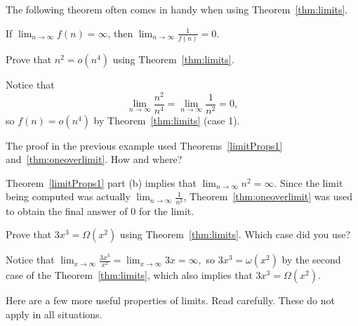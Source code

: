 The following theorem often comes in handy when using Theorem~\ref{thm:limits}.
\begin{thm}\label{thm:oneoverlimit}
If $\displaystyle \lim_{n\rightarrow \infty} f(n)=\infty$, then  
$\displaystyle \lim_{n\rightarrow \infty} \frac{1}{f(n)}=0$.
\end{thm}


\begin{exa}
Prove that  $n^2=o(n^4)$ using Theorem~\ref{thm:limits}.
\begin{sol}
Notice that 
$$\lim_{n\rightarrow\infty}\frac{n^2}{n^4}=
\lim_{n\rightarrow\infty}\frac{1}{n^2}=0,$$
so $f(n)=o(n^4)$ by Theorem~\ref{thm:limits} (case 1).
\end{sol}
\end{exa}

\begin{ques}
The proof in the previous example used Theorems~\ref{limitProps1}
and~\ref{thm:oneoverlimit}. How and where?

\noindent
\answerlinetwo
\begin{answer}
Theorem~\ref{limitProps1} part (b) implies that  
$\displaystyle\lim_{n\rightarrow\infty} n^2=\infty$. 
Since the limit being computed was actually 
$\displaystyle \lim_{n\rightarrow\infty}\frac{1}{n^2}$,
Theorem~\ref{thm:oneoverlimit}
was used to obtain the final answer of $0$ for the limit.
\end{answer}
\end{ques}

\begin{exer}
Prove that $3x^3=\Omega(x^2)$ using Theorem~\ref{thm:limits}.  Which case did you use?

\vspace*{1.75in}
\begin{answer}
Notice that $\lim_{x\rightarrow\infty}\frac{3x^3}{x^2}=
\lim_{x\rightarrow\infty}3x=\infty,$
so $3x^3=\omega(x^2)$ by the second case of the Theorem~\ref{thm:limits}, which also implies
that $3x^3=\Omega(x^2)$.
\end{answer}
\end{exer}

Here are a few more useful properties of limits.  
Read carefully.  These do not apply in all situations.

